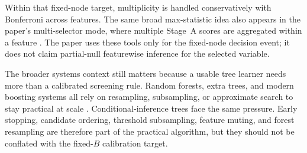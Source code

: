 Within that fixed-node target, multiplicity is handled conservatively with
Bonferroni across features. The same broad max-statistic idea also appears in
the paper's multi-selector mode, where multiple Stage~A scores are aggregated
within a feature \citep{WestfallYoung1993ResamplingBasedMultipleTesting}. The
paper uses these tools only for the fixed-node decision event; it does not
claim partial-null featurewise inference for the selected variable.

The broader systems context still matters because a usable tree learner needs
more than a calibrated screening rule. Random forests, extra trees, and modern
boosting systems all rely on resampling, subsampling, or approximate search to
stay practical at scale
\citep{Breiman2001RandomForests,Geurts2006ExtraTrees,Friedman2001GBM,ChenGuestrin2016XGBoost,Ke2017LightGBM,Prokhorenkova2018CatBoost}.
Conditional-inference trees face the same pressure. Early stopping, candidate
ordering, threshold subsampling, feature muting, and forest resampling are
therefore part of the practical algorithm, but they should not be conflated
with the fixed-$B$ calibration target.
